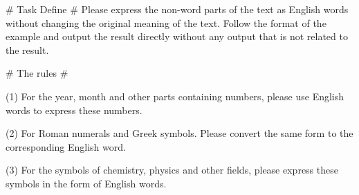\documentclass[11pt]{article}
\begin{document}
\begin{table}[htb]\centering
	\begin{tcolorbox}[width=1\linewidth, fontupper=\fontsize{10}{12}\selectfont]
		\# Task Define \# 
		Please express the non-word parts of the text as English words without changing the original meaning of the text. 
		Follow the format of the example and output the result directly without any output that is not related to the result.
		\vspace{\baselineskip} %
		
		
		\# The rules \# 
		\vspace{\baselineskip} %
		
		(1) For the year, month and other parts containing numbers, please use English words to express these numbers.
		\vspace{\baselineskip} %
		
		(2) For Roman numerals and Greek symbols. Please convert the same form to the corresponding English word.
		\vspace{\baselineskip} %
		
		(3) For the symbols of chemistry, physics and other fields, please express these symbols in the form of English words.
		\vspace{\baselineskip} %
		
	\end{tcolorbox}
	\captionsetup{justification=centering} %
	\caption{Prompt for query rewriting.}
	\label{appendix:query_rewrite_prompt}
\end{table}
\end{document}
